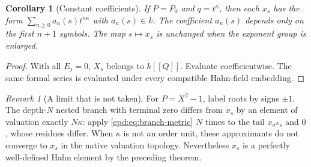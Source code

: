 \documentclass[11pt,a4paper]{article}
\numberwithin{equation}{section}
\theoremstyle{plain}
\newtheorem{corollary}[corollary]{Corollary}
\theoremstyle{definition}
\theoremstyle{remark}
\newtheorem{remark}[remark]{Remark}
\newcommand{\sh}{\sigma}
\begin{document}
\begin{corollary}[Constant coefficients]\label{epd:cor:constant-center}
If $P=P_0$ and $q=t^\kappa$, then each $x_s$ has the form
$\sum_{n\geq0}a_n(s)t^{n\kappa}$ with $a_n(s)\in k$. The coefficient
$a_n(s)$ depends only on the first $n+1$ symbols. The map $s\mapsto x_s$
is unchanged when the exponent group is enlarged.
\end{corollary}
\begin{proof}
With all $E_j=0$, $X_s$ belongs to $k[[Q]]$. Evaluate coefficientwise.
The same formal series is evaluated under every compatible Hahn-field
embedding.
\end{proof}

\begin{remark}[A limit that is not taken]\label{epd:rem:nestedlimit}
For $P=X^2-1$, label roots by signs $\pm1$. The depth-$N$ nested branch
with terminal zero differs from $x_s$ by an element of valuation exactly
$N\kappa$: apply \eqref{epd:eq:branch-metric} $N$ times to the tail $x_{\sh^N s}$
and $0$, whose residues differ. When $\kappa$ is not an order unit, these
approximants do not converge to $x_s$ in the native valuation topology.
Nevertheless $x_s$ is a perfectly well-defined Hahn element by the
preceding theorem.
\end{remark}
\end{document}
